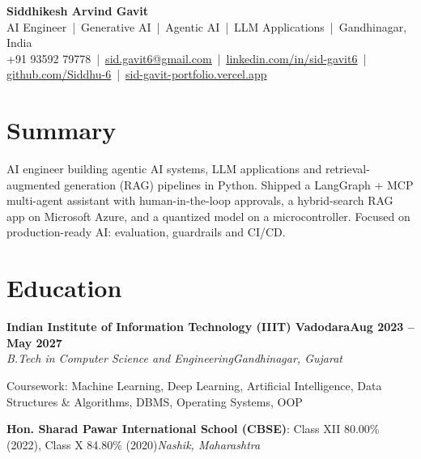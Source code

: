\documentclass[10pt,a4paper]{article}
\newcommand{\entry}[4]{%
  \textbf{#1}\hfill\textbf{#2}\\
  \textit{#3}\hfill\textit{#4}\par}
\newcommand{\link}[2]{\href{#1}{\color{accent}\underline{#2}}}
\begin{document}
\begin{center}
  {\fontsize{19}{21}\selectfont\bfseries Siddhikesh Arvind Gavit}\\[3pt]
  AI Engineer \,|\, Generative AI \,|\, Agentic AI \,|\, LLM Applications \,|\, Gandhinagar, India\\[2pt]
  {\small +91 93592 79778 \,|\,
  \link{mailto:sid.gavit6@gmail.com}{sid.gavit6@gmail.com} \,|\,
  \link{https://www.linkedin.com/in/sid-gavit6}{linkedin.com/in/sid-gavit6} \,|\,
  \link{https://github.com/Siddhu-6}{github.com/Siddhu-6} \,|\,
  \link{https://sid-gavit-portfolio.vercel.app/}{sid-gavit-portfolio.vercel.app}}
\end{center}
\vspace{-9pt}

\section{Summary}
AI engineer building agentic AI systems, LLM applications and retrieval-augmented generation (RAG) pipelines in Python.
Shipped a LangGraph + MCP multi-agent assistant with human-in-the-loop approvals, a hybrid-search RAG app on Microsoft
Azure, and a quantized model on a microcontroller. Focused on production-ready AI: evaluation, guardrails and CI/CD.

\section{Education}
\entry{Indian Institute of Information Technology (IIIT) Vadodara}{Aug 2023 -- May 2027}
      {B.Tech in Computer Science and Engineering}{Gandhinagar, Gujarat}
{\small Coursework: Machine Learning, Deep Learning, Artificial Intelligence, Data Structures \& Algorithms, DBMS, Operating Systems, OOP}\par
\vspace{1.5pt}
\textbf{Hon. Sharad Pawar International School (CBSE)}: Class XII 80.00\% (2022), Class X 84.80\% (2020)\hfill\textit{Nashik, Maharashtra}\par

\end{document}
